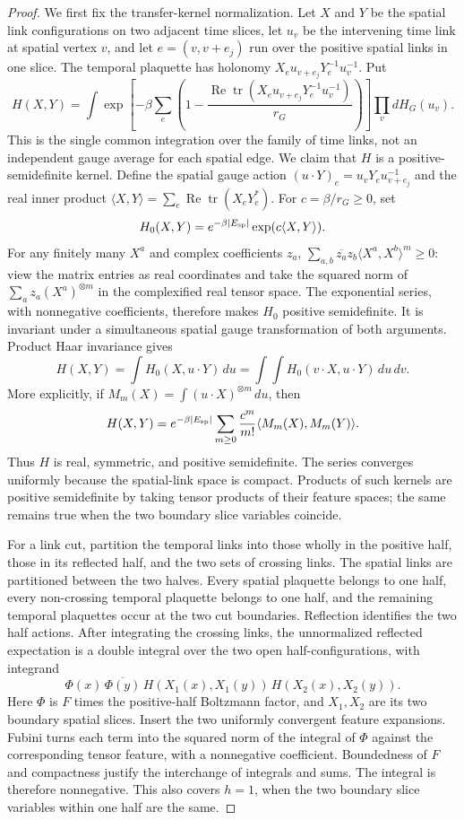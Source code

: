 \begin{proof}
We first fix the transfer-kernel normalization. Let $X$ and $Y$ be the
spatial link configurations on two adjacent time slices, let $u_v$ be the
intervening time link at spatial vertex $v$, and let $e=(v,v+e_j)$ run over
the positive spatial links in one slice. The temporal plaquette has holonomy
$X_eu_{v+e_j}Y_e^{-1}u_v^{-1}$. Put
\[
 H(X,Y)=\int\exp\!\left[-\beta\sum_e
 \left(1-\frac{\operatorname{Re}\operatorname{tr}
 (X_eu_{v+e_j}Y_e^{-1}u_v^{-1})}{r_G}\right)\right]
 \prod_v dH_G(u_v).
\]
This is the single common integration over the family of time links, not an
independent gauge average for each spatial edge. We claim that $H$ is a
positive-semidefinite kernel. Define the spatial gauge action
$(u\cdot Y)_e=u_vY_eu_{v+e_j}^{-1}$ and the real inner product
$\langle X,Y\rangle=\sum_e\operatorname{Re}\operatorname{tr}(X_eY_e^*)$.
For $c=\beta/r_G\geq0$, set
\[
 H_0(X,Y)=e^{-\beta |E_{\rm sp}|}\exp(c\langle X,Y\rangle).
\]
For any finitely many $X^a$ and complex coefficients $z_a$,
$\sum_{a,b}\overline{z_a}z_b\langle X^a,X^b\rangle^m\geq0$:
view the matrix entries as real coordinates and take the squared norm of
$\sum_a z_a(X^a)^{\otimes m}$ in the complexified real tensor space. The
exponential series, with nonnegative coefficients, therefore makes $H_0$
positive semidefinite. It is invariant under a simultaneous spatial gauge
transformation of both arguments. Product Haar invariance gives
\[
 H(X,Y)=\int H_0(X,u\cdot Y)\,du
       =\int\!\!\int H_0(v\cdot X,u\cdot Y)\,du\,dv.
\]
More explicitly, if $M_m(X)=\int(u\cdot X)^{\otimes m}\,du$, then
\[
 H(X,Y)=e^{-\beta |E_{\rm sp}|}\sum_{m\geq0}
 \frac{c^m}{m!}\langle M_m(X),M_m(Y)\rangle.
\]
Thus $H$ is real, symmetric, and positive semidefinite. The series converges
uniformly because the spatial-link space is compact. Products of such kernels
are positive semidefinite by taking tensor products of their feature spaces;
the same remains true when the two boundary slice variables coincide.

For a link cut, partition the temporal links into those wholly in the positive
half, those in its reflected half, and the two sets of crossing links. The
spatial links are partitioned between the two halves. Every spatial plaquette
belongs to one half, every non-crossing temporal plaquette belongs to one
half, and the remaining temporal plaquettes occur at the two cut boundaries.
Reflection identifies the two half actions. After integrating the crossing
links, the unnormalized reflected expectation is a double integral over the
two open half-configurations, with integrand
\[
 \Phi(x)\,\overline{\Phi(y)}\,
 H(X_1(x),X_1(y))\,H(X_2(x),X_2(y)).
\]
Here $\Phi$ is $F$ times the positive-half Boltzmann factor, and $X_1,X_2$
are its two boundary spatial slices. Insert the two uniformly convergent
feature expansions. Fubini turns each term into the squared norm of the
integral of $\Phi$ against the corresponding tensor feature, with a
nonnegative coefficient. Boundedness of $F$ and compactness justify the
interchange of integrals and sums. The integral is therefore nonnegative.
This also covers $h=1$, when the two boundary slice variables within one half
are the same.


\end{proof}
